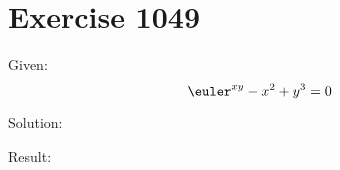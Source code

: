 \documentclass[a4paper, 10pt]{scrartcl}
\begin{document}
\section{Exercise 1049}

Given:
\[
\euler^{xy} - x^{2} + y^{3} = 0
\]

Solution:

Result:
\end{document}
